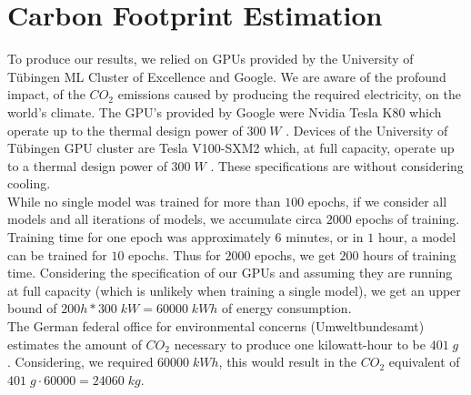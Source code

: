 \documentclass[a4paper,cleardoubleempty,BCOR1cm, 11pt]{report}
\begin{document}
\section{Carbon Footprint Estimation}
To produce our results, we relied on GPUs provided by the University of Tübingen ML Cluster of Excellence and Google. We are aware of the profound impact, of the $CO_2$ emissions caused by producing the required electricity, on the world's climate.
The GPU's provided by Google were Nvidia Tesla K80 which operate up to the thermal design power of $300\;W$ \cite{nvidia2015tesla}. Devices of the University of Tübingen GPU cluster are Tesla V100-SXM2 which, at full capacity, operate up to a thermal design power of $300\;W$ \cite{nvidia2017tesla}. These specifications are without considering cooling.\\
While no single model was trained for more than $100$ epochs, if we consider all models and all iterations of models, we accumulate circa $2000$ epochs of training. Training time for one epoch was approximately $6$ minutes, or in $1$ hour, a model can be trained for $10$ epochs. Thus for $2000$ epochs, we get $200$ hours of training time. Considering the specification of our GPUs and assuming they are running at full capacity (which is unlikely when training a single model), we get an upper bound of $200h * 300\;kW = 60000\;kWh$ of energy consumption.\\
The German federal office for environmental concerns (Umweltbundesamt) estimates the amount of $CO_2$ necessary to produce one kilowatt-hour to be $401\;g$ \cite{icha2016entwicklung}. Considering, we required $60000\;kWh$, this would result in the $CO_2$ equivalent of $401\;g \cdot 60000 = 24060\;kg$.
\end{document}
